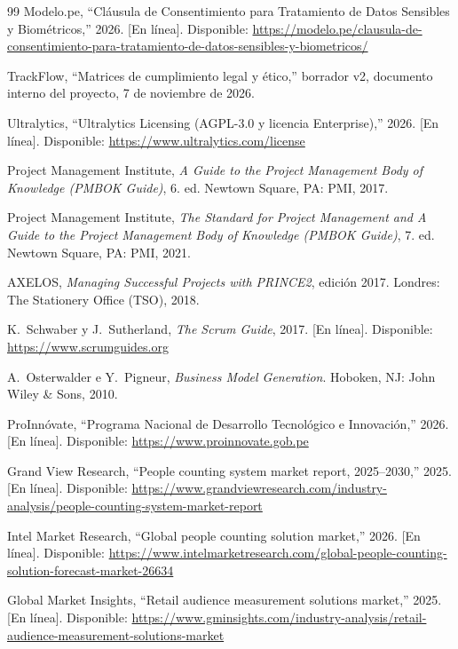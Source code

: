 \documentclass[12pt,a4paper]{article}
\begin{document}
\begin{thebibliography}{99}
Modelo.pe, ``Cláusula de Consentimiento para Tratamiento de Datos Sensibles y
Biométricos,'' 2026. [En línea]. Disponible:
\url{https://modelo.pe/clausula-de-consentimiento-para-tratamiento-de-datos-sensibles-y-biometricos/}

TrackFlow, ``Matrices de cumplimiento legal y ético,'' borrador v2, documento
interno del proyecto, 7 de noviembre de 2026.


Ultralytics, ``Ultralytics Licensing (AGPL-3.0 y licencia Enterprise),'' 2026.
[En línea]. Disponible: \url{https://www.ultralytics.com/license}

Project Management Institute, \textit{A Guide to the Project Management Body of
Knowledge (PMBOK Guide)}, 6.\textordfeminine{} ed. Newtown Square, PA: PMI, 2017.

Project Management Institute, \textit{The Standard for Project Management and A
Guide to the Project Management Body of Knowledge (PMBOK Guide)},
7.\textordfeminine{} ed. Newtown Square, PA: PMI, 2021.

AXELOS, \textit{Managing Successful Projects with PRINCE2}, edición 2017.
Londres: The Stationery Office (TSO), 2018.

K.~Schwaber y J.~Sutherland, \textit{The Scrum Guide}, 2017. [En línea].
Disponible: \url{https://www.scrumguides.org}

A.~Osterwalder e Y.~Pigneur, \textit{Business Model Generation}. Hoboken, NJ:
John Wiley \& Sons, 2010.

ProInnóvate, ``Programa Nacional de Desarrollo Tecnológico e Innovación,'' 2026.
[En línea]. Disponible: \url{https://www.proinnovate.gob.pe}

Grand View Research, ``People counting system market report, 2025--2030,''
2025. [En línea]. Disponible:
\url{https://www.grandviewresearch.com/industry-analysis/people-counting-system-market-report}

Intel Market Research, ``Global people counting solution market,'' 2026. [En línea]. Disponible:
\url{https://www.intelmarketresearch.com/global-people-counting-solution-forecast-market-26634}

Global Market Insights, ``Retail audience measurement solutions market,''
2025. [En línea]. Disponible:
\url{https://www.gminsights.com/industry-analysis/retail-audience-measurement-solutions-market}


\end{thebibliography}
\end{document}
